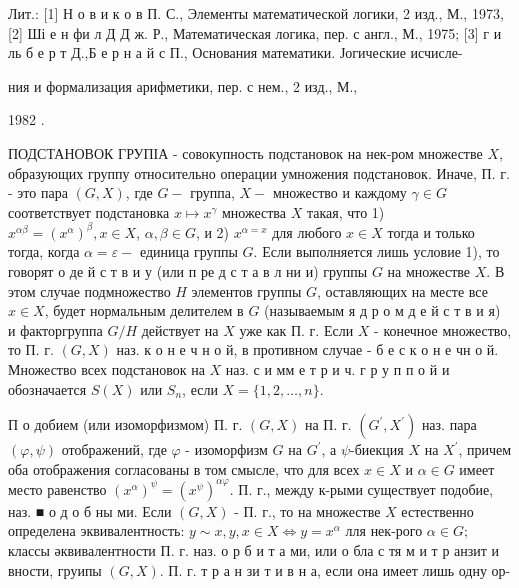 \documentclass[10pt]{article}
\begin{document}
Лит.: [1] Н о в и к о в П. С., Элементы математической логики, 2 изд., М., 1973, [2] Ші е н фи л Д Д ж. Р., Математическая логика, пер. с англ., М., 1975; [3] г и ль б е р т Д.,Б е р н а й с П., Основания математики. Јогические исчисле-

ния и формализация арифметики, пер. с нем., 2 изд., М.,

1982 .



ПОДСТАНОВОК ГРУПІА - совокупность подстановок на нек-ром множестве $X$, образующих группу относительно операции умножения подстановок. Иначе, П. г. - это пара $(G, X)$, где $G-$ группа, $X-$ множество и каждому $\gamma \in G$ соответствует подстановка $x \mapsto x^{\gamma}$ множества $X$ такая, что 1) $x^{\alpha \beta}=\left(x^{\alpha}\right)^{\beta}, x \in X$, $\alpha, \beta \in G$, и 2) $x^{\alpha=x}$ для любого $x \in X$ тогда и только тогда, когда $\alpha=\varepsilon-$ единица группы $G$. Если выполняется лишь условие 1), то говорят о де й с т в и у (или п ре д с т а в л ни и) группы $G$ на множестве $X$. В этом случае подмножество $H$ элементов группы $G$, оставляющих на месте все $x \in X$, будет нормальным делителем в $G$ (называемым я д р о м д е й с т в и я) и факторгруппа $G / H$ действует на $X$ уже как П. г. Если $X$ - конечное множество, то П. г. $(G, X)$ наз. к о н е ч н о й, в противном случае - б е с к о н е чн о й. Множество всех подстановок на $X$ наз. с и мм е т р и ч. г р у п п о й и обозначается $S(X)$ или $S_{n}$, если $X=\{1,2, \ldots, n\}$.



П о добием (или изоморфизмом) П. г. $(G, X)$ на П. г. $\left(G^{\prime}, X^{\prime}\right)$ наз. пара $(\varphi, \psi)$ отображений, где $\varphi$ - изоморфизм $G$ на $G^{\prime}$, а $\psi$-биекция $X$ на $X^{\prime}$, причем оба отображения согласованы в том смысле, что для всех $x \in X$ и $\alpha \in G$ имеет место равенство $\left(x^{\alpha}\right)^{\psi}=\left(x^{\psi}\right)^{\alpha \varphi}$. П. г., между к-рыми существует подобие, наз. ■ о д о б ны ми. Если $(G, X)$ - П. г., то на множестве $X$ естественно определена эквивалентность: $y \sim x, y, x \in X \Longleftrightarrow y=x^{\alpha}$ лля нек-рого $\alpha \in G ; \quad$ классы әквивалентности П. г. наз. о р б и т а ми, или о бла с тя м и т р анзит и вности, груипы $(G, X)$. П. г. т р а н зи т и в н а, если она имеет лишь одну ор-
\end{document}
